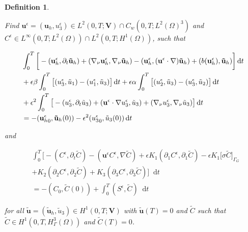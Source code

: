 \documentclass[11pt]{article}
\newtheorem{definition}{Definition}
\newcommand*\diff{\mathop{}\!\mathrm{d}}
\begin{document}
 \begin{definition} \label{definitionanisotropicWF}
  
  Find $\mathbf{u}^\epsilon = (\mathbf{u}_h, u^\epsilon_3) \in L^2 (0,T ; \mathbf{V}) \cap C_w (0, T; L^2 (\Omega)^3)$ and $C^\epsilon \in L^\infty (0,T; L^2(\Omega)) \cap L^2 (0,T; H^1(\Omega))$, such that
  
  \begin{equation}
    \begin{split}
      & \int_0^T \bigg [ -(\mathbf{u}^\epsilon_h, \partial_t \mathbf{\tilde{u}}_h) + (\nabla_\nu \mathbf{u}^\epsilon_h, \nabla_\nu \mathbf{\tilde{u}}_h) - (\mathbf{u}^\epsilon_h, (\mathbf{u}^\epsilon \cdot \nabla) \mathbf{\tilde{u}}_h) + (b(\mathbf{u}^\epsilon_h), \mathbf{\tilde{u}}_h) \bigg ] \diff t \\
      & + \epsilon \beta \int_0 ^ T \big [ (u_3 ^\epsilon, \tilde{u}_1) - (u_1^\epsilon, \tilde{u}_3) \big ] \diff t + \epsilon \alpha \int_0 ^ T \big [ (u_2 ^\epsilon, \tilde{u}_3) - (u_3^\epsilon, \tilde{u}_2) \big ] \diff t\\
      & + \epsilon^2 \int _0 ^ T \big [ -(u_3^\epsilon, \partial_t \tilde{u}_3) +(\mathbf{u}^\epsilon \cdot \nabla u_3 ^ \epsilon, \tilde{u}_3) + (\nabla_\nu u_3^\epsilon, \nabla_\nu \tilde{u}_3) \big ] \diff t \\
      & = - ({\mathbf{u}^\epsilon_h}_0, \mathbf{\tilde{u}}_h(0)) - \epsilon^2 ({u^\epsilon_3}_0, \tilde{u}_3 (0)) \diff t \raisetag{20pt} \label{anisotropicWF}
    \end{split}
  \end{equation}
  
    and
  
    \begin{equation}
    \begin{split} \nonumber
      & \int_0^T \bigg [ -(C^\epsilon, \partial_t \tilde{C}) -(\mathbf{u}^\epsilon C^\epsilon, \nabla \tilde{C}) + \epsilon K_1 (\partial_1 C^\epsilon, \partial_1 \tilde{C}) - \epsilon K_1 \big[\sigma \tilde{C} \big] _{\Gamma_G} \\
      & + K_2 (\partial_2 C^\epsilon, \partial_2 \tilde{C}) + K_3 (\partial_3 C^\epsilon, \partial_3 \tilde{C}) \bigg ] \diff t \\
      & =  - (C_0, \tilde{C} (0)) + \int_0^T (S^\epsilon,\tilde{C}) \diff t
    \end{split}
  \end{equation}
  
  for all $\mathbf{\tilde{u}} = (\mathbf{\tilde{u}}_h, \tilde{u}_3) \in H^1 (0,T;\mathbf{V})$ with $\mathbf{\tilde{u}}(T) = 0$ and $\tilde{C}$ such that $\tilde{C} \in H^1 (0,T, H^3_{\Gamma} (\Omega))$ and $\tilde{C} (T) = 0$.
  
  \end{definition}
\end{document}

